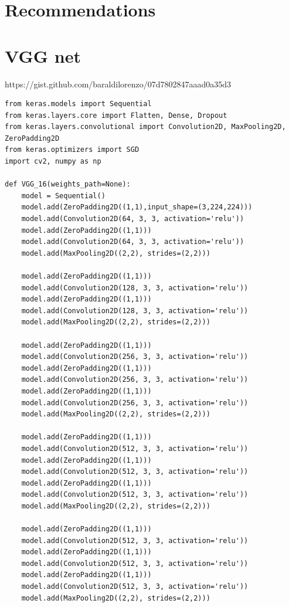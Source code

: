 \documentclass[12pt, a4paper, oneside, headinclude, footinclude]{article}
\begin{document}
\section{Recommendations}

\appendix

\section{VGG net}
https://gist.github.com/baraldilorenzo/07d7802847aaad0a35d3

\begin{verbatim}
from keras.models import Sequential
from keras.layers.core import Flatten, Dense, Dropout
from keras.layers.convolutional import Convolution2D, MaxPooling2D, ZeroPadding2D
from keras.optimizers import SGD
import cv2, numpy as np

def VGG_16(weights_path=None):
    model = Sequential()
    model.add(ZeroPadding2D((1,1),input_shape=(3,224,224)))
    model.add(Convolution2D(64, 3, 3, activation='relu'))
    model.add(ZeroPadding2D((1,1)))
    model.add(Convolution2D(64, 3, 3, activation='relu'))
    model.add(MaxPooling2D((2,2), strides=(2,2)))

    model.add(ZeroPadding2D((1,1)))
    model.add(Convolution2D(128, 3, 3, activation='relu'))
    model.add(ZeroPadding2D((1,1)))
    model.add(Convolution2D(128, 3, 3, activation='relu'))
    model.add(MaxPooling2D((2,2), strides=(2,2)))

    model.add(ZeroPadding2D((1,1)))
    model.add(Convolution2D(256, 3, 3, activation='relu'))
    model.add(ZeroPadding2D((1,1)))
    model.add(Convolution2D(256, 3, 3, activation='relu'))
    model.add(ZeroPadding2D((1,1)))
    model.add(Convolution2D(256, 3, 3, activation='relu'))
    model.add(MaxPooling2D((2,2), strides=(2,2)))

    model.add(ZeroPadding2D((1,1)))
    model.add(Convolution2D(512, 3, 3, activation='relu'))
    model.add(ZeroPadding2D((1,1)))
    model.add(Convolution2D(512, 3, 3, activation='relu'))
    model.add(ZeroPadding2D((1,1)))
    model.add(Convolution2D(512, 3, 3, activation='relu'))
    model.add(MaxPooling2D((2,2), strides=(2,2)))

    model.add(ZeroPadding2D((1,1)))
    model.add(Convolution2D(512, 3, 3, activation='relu'))
    model.add(ZeroPadding2D((1,1)))
    model.add(Convolution2D(512, 3, 3, activation='relu'))
    model.add(ZeroPadding2D((1,1)))
    model.add(Convolution2D(512, 3, 3, activation='relu'))
    model.add(MaxPooling2D((2,2), strides=(2,2)))


\end{verbatim}
\end{document}
